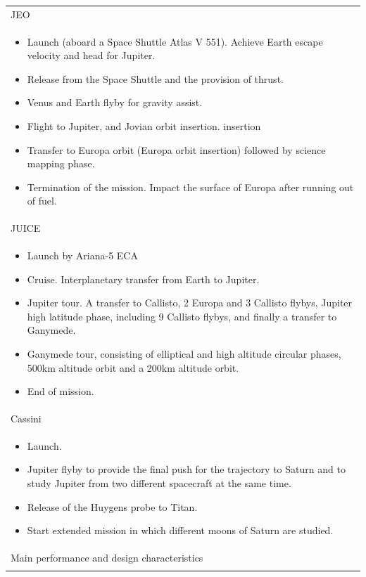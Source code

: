 \begin{supertabular}{p{\textwidth}}
  JEO \\ \begin{itemize}
  \item Launch (aboard a Space Shuttle Atlas V 551). Achieve Earth
    escape velocity and head for Jupiter.
  \item Release from the Space Shuttle and the provision of thrust.
  \item Venus and Earth flyby for gravity assist.
  \item Flight to Jupiter, and Jovian orbit insertion.  insertion
  \item Transfer to Europa orbit (Europa orbit insertion) followed by
    science mapping phase.
  \item Termination of the mission. Impact the surface of Europa after
    running out of fuel.
  \end{itemize} \\

  JUICE \\ \begin{itemize}
  \item Launch by Ariana-5 ECA
  \item Cruise. Interplanetary transfer from Earth to Jupiter.
  \item Jupiter tour. A transfer to Callisto, 2 Europa and 3 Callisto
    flybys, Jupiter high latitude phase, including 9 Callisto flybys,
    and finally a transfer to Ganymede.
  \item Ganymede tour, consisting of elliptical and high altitude
    circular phases, 500km altitude orbit and a 200km altitude orbit.
  \item End of mission.
  \end{itemize} \\

  Cassini \\ \begin{itemize}
  \item Launch.
  \item Jupiter flyby to provide the final push for the trajectory to
    Saturn and to study Jupiter from two different spacecraft at the
    same time.
  \item Release of the Huygens probe to Titan.
  \item Start extended mission in which different moons of Saturn are
    studied.
  \end{itemize} \\

  Main performance and design characteristics \\ \hline \\


\end{supertabular}
